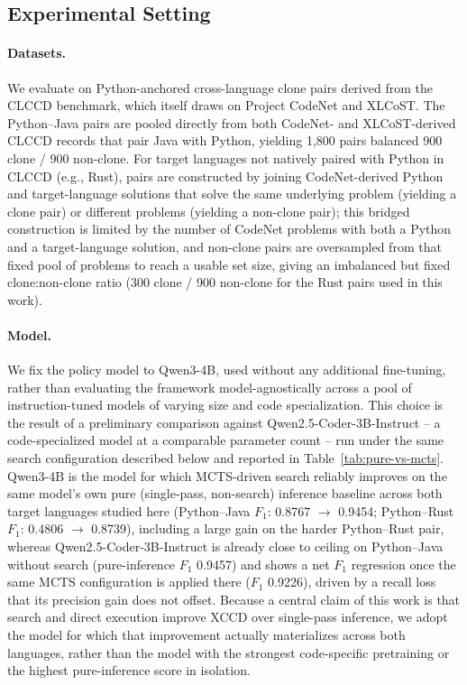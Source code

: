 \subsection{Experimental Setting}
\label{subsec:experimental_setting}

\paragraph{Datasets.} We evaluate on Python-anchored cross-language clone
pairs derived from the CLCCD benchmark, which itself draws on Project
CodeNet and XLCoST. The Python--Java pairs are pooled directly from both
CodeNet- and XLCoST-derived CLCCD records that pair Java with Python,
yielding 1{,}800 pairs balanced 900 clone / 900 non-clone. For target
languages not natively paired with Python in CLCCD (e.g., Rust), pairs are
constructed by joining CodeNet-derived Python and target-language solutions
that solve the same underlying problem (yielding a clone pair) or different
problems (yielding a non-clone pair); this bridged construction is limited by
the number of CodeNet problems with both a Python and a target-language
solution, and non-clone pairs are oversampled from that fixed pool of
problems to reach a usable set size, giving an imbalanced but fixed
clone:non-clone ratio (300 clone / 900 non-clone for the Rust pairs used in
this work).

\paragraph{Model.} We fix the policy model to Qwen3-4B, used without any
additional fine-tuning, rather than evaluating the framework model-agnostically
across a pool of instruction-tuned models of varying size and code
specialization. This choice is the result of a preliminary comparison against
Qwen2.5-Coder-3B-Instruct -- a code-specialized model at a comparable parameter
count -- run under the same search configuration described below and reported
in Table~\ref{tab:pure-vs-mcts}. Qwen3-4B is the model for which MCTS-driven
search reliably improves on the same model's own pure (single-pass,
non-search) inference baseline across both target languages studied here
(Python--Java $F_1$: 0.8767 $\rightarrow$ 0.9454; Python--Rust $F_1$: 0.4806
$\rightarrow$ 0.8739), including a large gain on the harder Python--Rust pair,
whereas Qwen2.5-Coder-3B-Instruct is already close to ceiling on Python--Java
without search (pure-inference $F_1$ 0.9457) and shows a net $F_1$ regression
once the same MCTS configuration is applied there ($F_1$ 0.9226), driven by a
recall loss that its precision gain does not offset. Because a central claim
of this work is that search and direct execution improve XCCD over
single-pass inference, we adopt the model for which that improvement actually
materializes across both languages, rather than the model with the strongest
code-specific pretraining or the highest pure-inference score in isolation.

